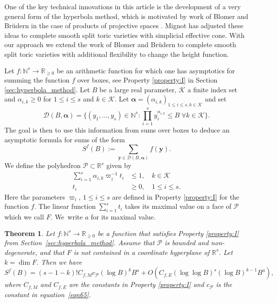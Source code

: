 \documentclass[JEP,XML,SOM,Unicode,published]{cedram}
\let\ts\textstyle
\newcommand{\cD}{\mathcal{D}}
\newcommand{\cBalp}{\cD(B,\bfalp)}
\newcommand{\bfy}{\boldsymbol{y}}
\newcommand{\bfalp}{\boldsymbol{\alpha}}
\newcommand{\calK}{\mathcal{K}}
\newcommand{\calP}{\mathcal{P}}
\newcommand\NN{\mathbb{N}}
\newcommand{\N}{\mathbb{N}}
\newcommand\R{\mathbb{R}}
\newtheorem{theorem}{Theorem}
\theoremstyle{definition}
\numberwithin{theorem}{section}
\begin{document}
One of the key technical innovations in this article is the development of a very general form of the hyperbola method, which is motivated by work of Blomer and Brüdern in the case of products of projective spaces \cite{BB}. Mignot \cite{mignot2} has adjusted these ideas to complete smooth split toric varieties with simplicial effective cone.
With our approach we extend the work of Blomer and Brüdern to complete smooth split toric varieties with additional flexibility to change the height function.\par
Let $f: \N^s\rightarrow \R_{\geq 0}$ be an arithmetic function for which one has asymptotics for summing the function $f$ over boxes, see Property \ref{property:I} in Section \ref{sec:hyperbola_method}. Let $B$ be a large real parameter, $\calK$ a finite index set and $\alpha_{i,k}\geq 0$ for $1\leq i\leq s$ and $k\in \calK$. Let $\bfalp=(\alpha_{i,k})_{1\leq i\leq s,k\in\calK}$ and set\vspace*{-3pt}
\[\ts
\cBalp=\bigl\{(y_1,\dots,y_s)\in\NN^s:\prod_{i=1}^sy_i^{\alpha_{i,k}}\leq B\;\forall k\in\calK\bigr\}.
\]
The goal is then to use this information from sums over boxes to deduce an asymptotic formula for sums of the form\vspace*{-5pt}
\begin{equation*}
S^{f}(B):=\sum_{\bfy\in\cBalp}f(\bfy).
\end{equation*}
We define the polyhedron $\calP \subset \R^s$ given by\vspace*{-5pt}
\begin{align*}
\sum_{i=1}^s \alpha_{i,k} \varpi_i^{-1} t_i&\leq 1, \quad k\in \calK
\\[-5pt]
\tag*{and}
t_i&\geq 0,\quad 1\leq i\leq s.
\end{align*}
Here the parameters $\varpi_i$, $1\leq i\leq s$ are defined in Property \ref{property:I} for the function $f$. The linear function $\sum_{i=1}^s t_i$ takes its maximal value on a face of $\calP$ which we call $F$. We~write $a$ for its maximal value.

\begin{theorem}\label{lemhyp3}
Let $f:\N^s\rightarrow \R_{\geq 0}$ be a function that satisfies Property \ref{property:I} from Section~\ref{sec:hyperbola_method}.
Assume that $\calP$ is bounded and non-degenerate, and that $F$ is not contained in a coordinate hyperplane of $\R^s$. Let $k=\dim F$. Then we have\vspace*{-3pt}
\[
S^f(B)= (s-1-k)! C_{f,M}c_{\calP} (\log B)^kB^{a}
+O\left(C_{f,E} (\log \log B)^{s} (\log B)^{k-1} B^{a} \right),
\]
where $C_{f,M}$ and $C_{f,E}$ are the constants in Property \ref{property:I} and $c_\calP$ is the constant in equation~\eqref{eqn65}.
\end{theorem}
\end{document}
